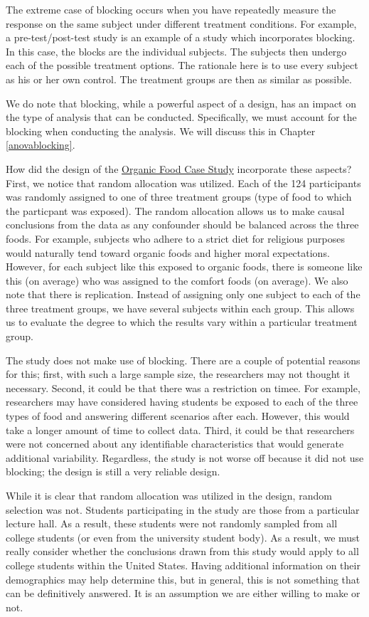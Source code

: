 \documentclass[]{book}
\theoremstyle{definition}
\theoremstyle{definition}
\theoremstyle{remark}
\begin{document}
The extreme case of blocking occurs when you have repeatedly measure the
response on the same subject under different treatment conditions. For
example, a pre-test/post-test study is an example of a study which
incorporates blocking. In this case, the blocks are the individual
subjects. The subjects then undergo each of the possible treatment
options. The rationale here is to use every subject as his or her own
control. The treatment groups are then as similar as possible.

We do note that blocking, while a powerful aspect of a design, has an
impact on the type of analysis that can be conducted. Specifically, we
must account for the blocking when conducting the analysis. We will
discuss this in Chapter \ref{anovablocking}.

How did the design of the \protect\hyperlink{CaseOrganic}{Organic Food
Case Study} incorporate these aspects? First, we notice that random
allocation was utilized. Each of the 124 participants was randomly
assigned to one of three treatment groups (type of food to which the
particpant was exposed). The random allocation allows us to make causal
conclusions from the data as any confounder should be balanced across
the three foods. For example, subjects who adhere to a strict diet for
religious purposes would naturally tend toward organic foods and higher
moral expectations. However, for each subject like this exposed to
organic foods, there is someone like this (on average) who was assigned
to the comfort foods (on average). We also note that there is
replication. Instead of assigning only one subject to each of the three
treatment groups, we have several subjects within each group. This
allows us to evaluate the degree to which the results vary within a
particular treatment group.

The study does not make use of blocking. There are a couple of potential
reasons for this; first, with such a large sample size, the researchers
may not thought it necessary. Second, it could be that there was a
restriction on timee. For example, researchers may have considered
having students be exposed to each of the three types of food and
answering different scenarios after each. However, this would take a
longer amount of time to collect data. Third, it could be that
researchers were not concerned about any identifiable characteristics
that would generate additional variability. Regardless, the study is not
worse off because it did not use blocking; the design is still a very
reliable design.

While it is clear that random allocation was utilized in the design,
random selection was not. Students participating in the study are those
from a particular lecture hall. As a result, these students were not
randomly sampled from all college students (or even from the university
student body). As a result, we must really consider whether the
conclusions drawn from this study would apply to all college students
within the United States. Having additional information on their
demographics may help determine this, but in general, this is not
something that can be definitively answered. It is an assumption we are
either willing to make or not.
\end{document}
